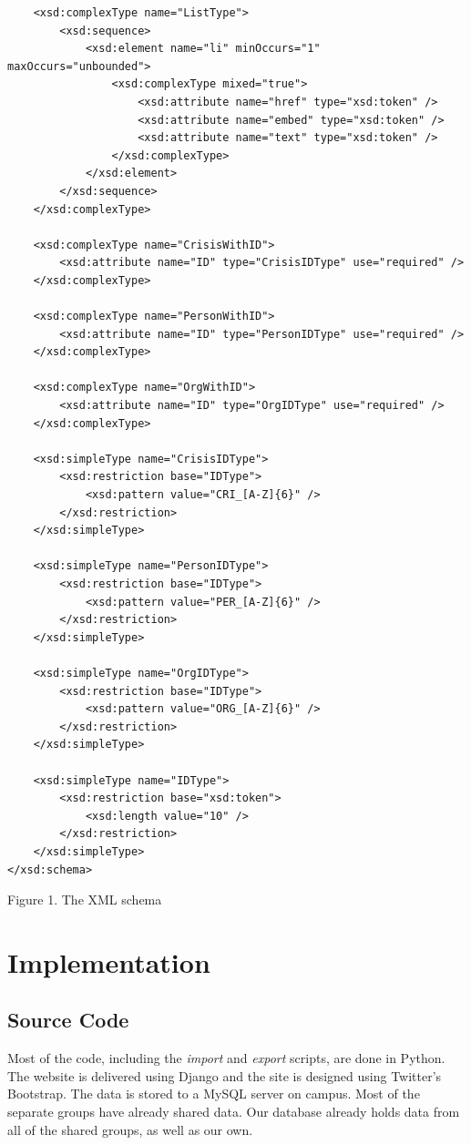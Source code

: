 \documentclass[12pt]{report}
\begin{document}
\begin{lstlisting}
    <xsd:complexType name="ListType">
        <xsd:sequence>
            <xsd:element name="li" minOccurs="1" maxOccurs="unbounded">
                <xsd:complexType mixed="true">
                    <xsd:attribute name="href" type="xsd:token" />
                    <xsd:attribute name="embed" type="xsd:token" />
                    <xsd:attribute name="text" type="xsd:token" />
                </xsd:complexType>
            </xsd:element>
        </xsd:sequence>
    </xsd:complexType>

    <xsd:complexType name="CrisisWithID">
        <xsd:attribute name="ID" type="CrisisIDType" use="required" />
    </xsd:complexType>
    
    <xsd:complexType name="PersonWithID">
        <xsd:attribute name="ID" type="PersonIDType" use="required" />
    </xsd:complexType>
    
    <xsd:complexType name="OrgWithID">
        <xsd:attribute name="ID" type="OrgIDType" use="required" />
    </xsd:complexType>

    <xsd:simpleType name="CrisisIDType">
        <xsd:restriction base="IDType">
            <xsd:pattern value="CRI_[A-Z]{6}" />
        </xsd:restriction>
    </xsd:simpleType>
    
    <xsd:simpleType name="PersonIDType">
        <xsd:restriction base="IDType">
            <xsd:pattern value="PER_[A-Z]{6}" />
        </xsd:restriction>
    </xsd:simpleType>
    
    <xsd:simpleType name="OrgIDType">
        <xsd:restriction base="IDType">
            <xsd:pattern value="ORG_[A-Z]{6}" />
        </xsd:restriction>
    </xsd:simpleType>

    <xsd:simpleType name="IDType">
        <xsd:restriction base="xsd:token">
            <xsd:length value="10" />
        </xsd:restriction>
    </xsd:simpleType>
</xsd:schema>
\end{lstlisting}
\footnotesize
Figure 1. The XML schema %
\normalsize

\newpage
\section*{Implementation}

\subsection*{Source Code}
Most of the code, including the \emph{import} and \emph{export} scripts, are done in Python.
The website is delivered using Django and the site is designed using Twitter's Bootstrap.
The data is stored to a MySQL server on campus.
Most of the separate groups have already shared data.
Our database already holds data from all of the shared groups, as well as our own.
\end{document}

